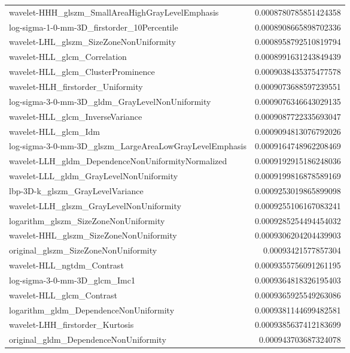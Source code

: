{\begin{xltabular}[H]{\textwidth}{X r}
        wavelet-HHH\_glszm\_SmallAreaHighGrayLevelEmphasis & 0.0008780785851424358 \\
        log-sigma-1-0-mm-3D\_firstorder\_10Percentile & 0.0008908665898702336 \\
        wavelet-LHL\_glszm\_SizeZoneNonUniformity & 0.0008958792510819794 \\
        wavelet-HLL\_glcm\_Correlation & 0.0008991631243849439 \\
        wavelet-HLL\_glcm\_ClusterProminence & 0.0009038435375477578 \\
        wavelet-HLH\_firstorder\_Uniformity & 0.0009073688597239551 \\
        log-sigma-3-0-mm-3D\_gldm\_GrayLevelNonUniformity & 0.0009076346643029135 \\
        wavelet-HLL\_glcm\_InverseVariance & 0.0009087722335693047 \\
        wavelet-HLL\_glcm\_Idm & 0.0009094813076792026 \\
        log-sigma-3-0-mm-3D\_glszm\_LargeAreaLowGrayLevelEmphasis & 0.0009164748962208469 \\
        wavelet-LLH\_gldm\_DependenceNonUniformityNormalized & 0.0009192915186248036 \\
        wavelet-LLL\_gldm\_GrayLevelNonUniformity & 0.0009199816878589169 \\
        lbp-3D-k\_glszm\_GrayLevelVariance & 0.0009253019865899098 \\
        wavelet-LLH\_glszm\_GrayLevelNonUniformity & 0.0009255106167083241 \\
        logarithm\_glszm\_SizeZoneNonUniformity & 0.0009285254494454032 \\
        wavelet-HHL\_glszm\_SizeZoneNonUniformity & 0.0009306204204439903 \\
        original\_glszm\_SizeZoneNonUniformity & 0.00093421577857304 \\
        wavelet-HLL\_ngtdm\_Contrast & 0.0009355756091261195 \\
        log-sigma-3-0-mm-3D\_glcm\_Imc1 & 0.0009364818326195403 \\
        wavelet-HLL\_glcm\_Contrast & 0.0009365925549263086 \\
        logarithm\_gldm\_DependenceNonUniformity & 0.0009381144699482581 \\
        wavelet-LHH\_firstorder\_Kurtosis & 0.0009385637412183699 \\
        original\_gldm\_DependenceNonUniformity & 0.000943703687324078 \\

\end{xltabular}}
